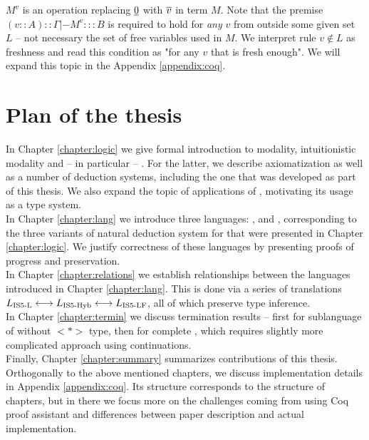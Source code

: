 $M^v$ is an operation replacing $\underline{0}$ with $\overline{v}$ in term $M$. Note that the premise $ (v::A)::\Gamma |- M ^ v ::: B $ is required to hold for \emph{any} $v$ from outside some given set $L$ -- not necessary the set of free variables used in $M$. We interpret rule $v \notin L$ as freshness and read this condition as "for any $v$ that is fresh enough". We will expand this topic in the Appendix \ref{appendix:coq}.

\section {Plan of the thesis}
In Chapter \ref{chapter:logic} we give formal introduction to modality, intuitionistic modality and -- in particular -- \logic{}. For the latter, we describe axiomatization as well as a number of deduction systems, including the one that was developed as part of this thesis. We also expand the topic of applications of \logic{}, motivating its usage as a type system.\\

In Chapter \ref{chapter:lang} we introduce three languages: \langL{}, \langLF{} and \langHyb{}, corresponding to the three variants of natural deduction system for \logic{} that were presented in Chapter \ref{chapter:logic}. We justify correctness of these languages by presenting proofs of progress and preservation.\\

In Chapter \ref{chapter:relations} we establish relationships between the languages introduced in Chapter \ref{chapter:lang}. This is done via a series of translations $L\textsubscript{IS5-L}{} <-> L\textsubscript{IS5-Hyb}{} <-> L\textsubscript{IS5-LF}{}$, all of which preserve type inference.\\

In Chapter \ref{chapter:termin} we discuss termination results  -- first for sublanguage of \langLF{} without $<*>$ type, then for complete \langLF{}, which requires slightly more complicated approach using continuations.\\

Finally, Chapter \ref{chapter:summary} summarizes contributions of this thesis.\\

Orthogonally to the above mentioned chapters, we discuss implementation details in Appendix \ref{appendix:coq}. Its structure corresponds to the structure of chapters, but in there we focus more on the challenges coming from using Coq proof assistant and differences between paper description and actual implementation.
